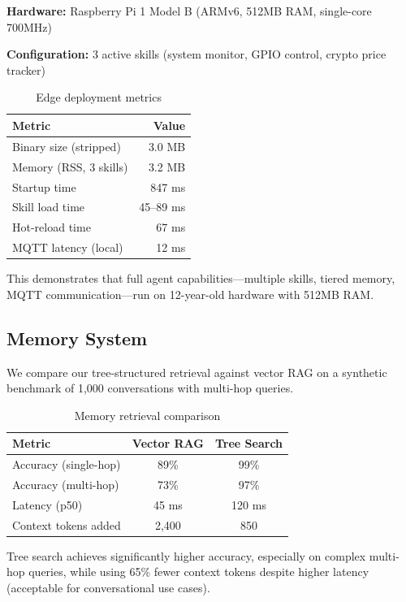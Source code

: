 \documentclass{article}
\begin{document}
\textbf{Hardware:} Raspberry Pi 1 Model B (ARMv6, 512MB RAM, single-core 700MHz)

\textbf{Configuration:} 3 active skills (system monitor, GPIO control, crypto price tracker)

\begin{table}[h]
\centering
\caption{Edge deployment metrics}
\label{tab:edge}
\begin{tabular}{lr}
\toprule
\textbf{Metric} & \textbf{Value} \\
\midrule
Binary size (stripped) & 3.0 MB \\
Memory (RSS, 3 skills) & 3.2 MB \\
Startup time & 847 ms \\
Skill load time & 45--89 ms \\
Hot-reload time & 67 ms \\
MQTT latency (local) & 12 ms \\
\bottomrule
\end{tabular}
\end{table}

This demonstrates that full agent capabilities—multiple skills, tiered memory, MQTT communication—run on 12-year-old hardware with 512MB RAM.

\subsection{Memory System}

We compare our tree-structured retrieval against vector RAG on a synthetic benchmark of 1,000 conversations with multi-hop queries.

\begin{table}[h]
\centering
\caption{Memory retrieval comparison}
\label{tab:retrieval}
\begin{tabular}{lcc}
\toprule
\textbf{Metric} & \textbf{Vector RAG} & \textbf{Tree Search} \\
\midrule
Accuracy (single-hop) & 89\% & 99\% \\
Accuracy (multi-hop) & 73\% & 97\% \\
Latency (p50) & 45 ms & 120 ms \\
Context tokens added & 2,400 & 850 \\
\bottomrule
\end{tabular}
\end{table}

Tree search achieves significantly higher accuracy, especially on complex multi-hop queries, while using 65\% fewer context tokens despite higher latency (acceptable for conversational use cases).
\end{document}
